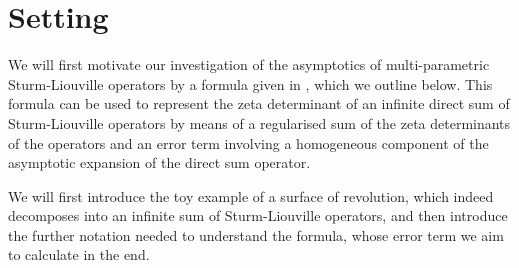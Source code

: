 \section{Setting}
We will first motivate our investigation of the asymptotics of multi-parametric
Sturm-Liouville operators by a formula given in \cite{LV13}, which we outline
below. This formula can be used to represent the zeta determinant of an infinite
direct sum of Sturm-Liouville operators by means of a regularised sum of the
zeta determinants of the operators and an error term involving a homogeneous
component of the asymptotic expansion of the direct sum operator.

We will first introduce the toy example of a surface of revolution, which indeed
decomposes into an infinite sum of Sturm-Liouville operators, and then introduce
the further notation needed to understand the formula, whose error term we aim
to calculate in the end.

